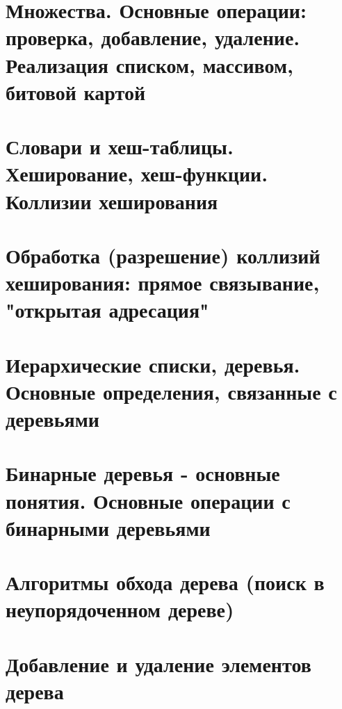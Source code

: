 \section{Множества. Основные операции: проверка, добавление, удаление. Реализация списком, массивом, битовой картой}
\section{Словари и хеш-таблицы. Хеширование, хеш-функции. Коллизии хеширования}
\section{Обработка (разрешение) коллизий хеширования: прямое связывание, "открытая адресация"}
\section{Иерархические списки, деревья. Основные определения, связанные с деревьями}
\section{Бинарные деревья - основные понятия. Основные операции с бинарными деревьями}
\section{Алгоритмы обхода дерева (поиск в неупорядоченном дереве)}
\section{Добавление и удаление элементов дерева}
